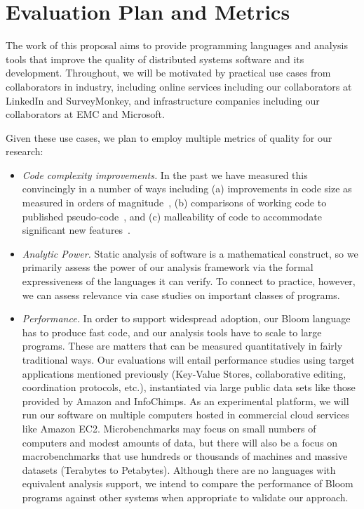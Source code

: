 \section{Evaluation Plan and Metrics}
The work of this proposal aims to provide programming languages and analysis tools that improve the quality of distributed systems software and its development.  Throughout, we will be motivated by practical use cases from collaborators in industry, including online services including our collaborators at LinkedIn and SurveyMonkey, and infrastructure companies including our collaborators at EMC and Microsoft.

Given these use cases, we plan to employ multiple metrics of quality for our research: 
\begin{itemize}
\item \emph{Code complexity improvements.}  In the past we have measured this convincingly in a number of ways including (a) improvements in code size as measured in orders of magnitude~\cite{boom-eurosys,p2}, (b) comparisons of working code to published pseudo-code~\cite{boom-eurosys,netdb}, and (c) malleability of code to accommodate significant new features~\cite{boom-eurosys}.  

\item \emph{Analytic Power.}  Static analysis of software is a mathematical construct, so we primarily assess the power of our analysis framework via the formal expressiveness of the languages it can verify.  To connect to practice, however, we can assess relevance via case studies on important classes of programs.

\item \emph{Performance.}  In order to support widespread adoption, our Bloom language has to produce fast code, and our analysis tools have to scale to large programs.  These are matters that can be measured quantitatively in fairly traditional ways.  Our evaluations will entail performance studies using target applications mentioned previously  (Key-Value Stores, collaborative editing, coordination protocols, etc.), instantiated via large public data sets like those provided by Amazon and InfoChimps.  As an experimental platform, we will run our software on multiple computers hosted in commercial cloud services like Amazon EC2.  Microbenchmarks may focus on small numbers of computers and modest amounts of data, but there will also be a focus on macrobenchmarks that use hundreds or thousands of machines and massive datasets (Terabytes to Petabytes).  Although there are no languages with equivalent analysis support, we intend to compare the performance of Bloom programs against other systems when appropriate to validate our approach. 
\end{itemize}

